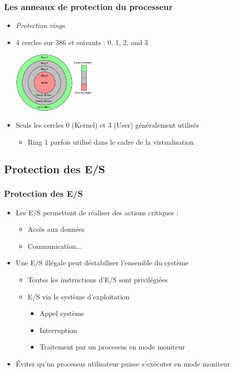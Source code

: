 \begin{frame}
\frametitle{Les anneaux de protection du processeur}
\begin{itemize}
\item \textit{Protection rings}
\item 4 cercles sur 386 et suivants : 0, 1, 2, and 3

  \includegraphics[height=3cm]{../illustration/cpu-ring-model.png}

\item Seuls les cercles 0 (Kernel) et 3 (User) généralement utilisés
\begin{itemize}
\item Ring 1 parfois utilisé dans le cadre de la virtualisation
\end{itemize}
\end{itemize}
\end{frame}

\subsection{Protection des E/S}

\begin{frame}
 \frametitle{Protection des E/S}
 \begin{itemize}
 \item Les E/S permettent de réaliser des actions critiques :
 \begin{itemize}
\item Accès aux données
\item Communication...
\end{itemize}
 \item Une E/S illégale peut déstabiliser l’ensemble du système
\begin{itemize}
\item Toutes les instructions d’E/S sont privilégiées
\item E/S via le système d’exploitation
\begin{itemize}
\item Appel système
\item Interruption
\item Traitement par un processus en mode moniteur
\end{itemize}
\end{itemize}
\item Éviter qu’un processus utilisateur puisse s’exécuter en mode moniteur
 \end{itemize}
\end{frame}


